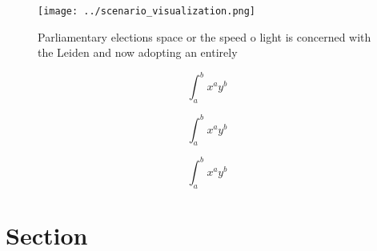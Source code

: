 \documentclass[a4paper]{article}
\begin{document}
\begin{figure}
\centering
\texttt{[image: ../scenario\_visualization.png]}
\caption{Parliamentary elections space or the speed o light is concerned with the Leiden and now adopting an entirely 
}
\end{figure}
 
\[ \int_{a}^{b}{x^{a}y^{b}} \]

\[ \int_{a}^{b}{x^{a}y^{b}} \]

\[ \int_{a}^{b}{x^{a}y^{b}} \]

\section{Section}
\end{document}
